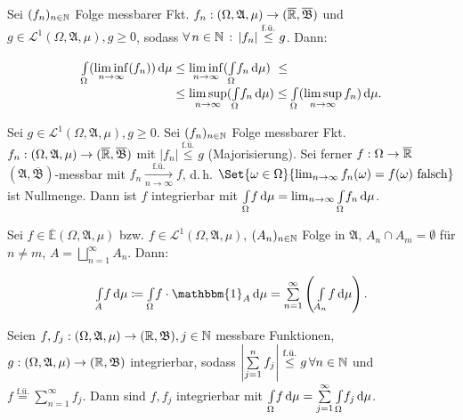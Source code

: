 \documentclass{cheat-sheet}
\newcommand{\Alg}{\mathfrak{A}} %
\newcommand{\Bor}{\mathfrak{B}} %
\newcommand{\E}{\mathbb{E}} %
\newcommand{\Leb}{\mathcal{L}} %
\newcommand{\ind}{\mathbbm{1}} %
\newcommand{\fue}{\overset{\text{f.ü.}}} %
\theoremstyle{definition}
\newcommand{\IntOmu}[1]{\Int{\Omega}{}{#1}{\mu}} %
\begin{document}
\vspace{-20pt}

\begin{satz}
  \begin{doublespace}
    Sei $(f_n)_{n \in \mathbb{N}}$ Folge messbarer Fkt. $f_n : (\Omega, \Alg, \mu) \to (\ER, \overline{\Bor})$ und $g \in \Leb^1(\Omega, \Alg, \mu), g \geq 0$, sodass $\forall \, {n \in \mathbb{N}} \,:\, \lvert f_n\rvert \overset{\text{f.ü.}}\leq g$. Dann:\\[-16pt]
  \end{doublespace}
  \begin{align*}
    \IntOmu{(\liminf_{n \to \infty} (f_n))}
    &\leq \liminf_{n \to \infty} (\IntOmu{f_n}) \,\,\leq\\[-5pt]
    &\leq \limsup_{n \to \infty} (\IntOmu{f_n})
    \leq \IntOmu{(\limsup_{n \to \infty} f_n)}.
  \end{align*}
\end{satz}

\begin{satz}\begin{doublespace}
  Sei $g \in \Leb^1(\Omega, \Alg, \mu), g \geq 0$. Sei $(f_n)_{n \in \mathbb{N}}$ Folge messbarer Fkt. $f_n : (\Omega, \Alg, \mu) \to (\ER, \overline{\Bor})$ mit $\left|f_n\right| \overset{\text{f.ü.}}\leq g$ (Majorisierung).
  Sei ferner $f : \Omega \to \overline{\mathbb{R}}$ $(\Alg, \overline{\Bor})$-messbar mit $f_n \xrightarrow[n \to \infty]{\text{f.ü.}} f$, d.\,h. $\Set{ \omega \in \Omega }{ \lim_{n \to \infty} f_n(\omega) = f(\omega) \text{ falsch} }$ ist Nullmenge. Dann ist $f$ integrierbar mit $\IntOmu{f} = \lim_{n \to \infty} \IntOmu{f_n}$.
\end{doublespace}\end{satz}

\vspace{-20pt}

\begin{satz}
  \begin{doublespace}
    Sei $f \in \overline{\E}(\Omega, \Alg, \mu)$ bzw. $f \in \Leb^1(\Omega, \Alg, \mu)$, $(A_n)_{n \in \mathbb{N}}$ Folge in $\Alg$, $A_n \cap A_m = \emptyset$ für $n \not= m$, $A = \bigsqcup_{n=1}^\infty A_n$. Dann:\\[-10pt]
  \end{doublespace}
  \[ \Int{A}{}{f}{\mu} \coloneqq \IntOmu{f \cdot \ind_A} = \sum_{n=1}^\infty \left( \Int{A_n}{}{f}{\mu} \right). \]
\end{satz}

\begin{satz}\begin{doublespace}
  Seien $f, f_j : (\Omega, \Alg, \mu) \to (\R, \Bor), j \in \N$ messbare Funktionen, $g : (\Omega, \Alg, \mu) \to (\R, \Bor)$ integrierbar, sodass $\left|\sum_{j=1}^n f_j\right| \overset{\text{f.ü.}}\leq g \, \forall n \in \N$ und\\[-5pt]
  $f \fue= \sum_{n=1}^\infty f_j$. Dann sind $f, f_j$ integrierbar mit $\IntOmu{f} = \sum_{j=1}^\infty \IntOmu{f_j}$.
\end{doublespace}\end{satz}
\end{document}
